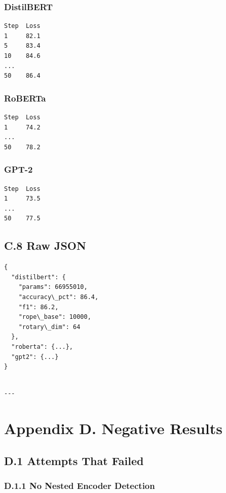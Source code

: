 \subsubsection{DistilBERT}
\begin{lstlisting}
Step  Loss
1     82.1
5     83.4
10    84.6
...
50    86.4
\end{lstlisting}

\subsubsection{RoBERTa}
\begin{lstlisting}
Step  Loss
1     74.2
...
50    78.2
\end{lstlisting}

\subsubsection{GPT-2}
\begin{lstlisting}
Step  Loss
1     73.5
...
50    77.5
\end{lstlisting}

\subsection{C.8 Raw JSON}

\begin{lstlisting}
{
  "distilbert": {
    "params": 66955010,
    "accuracy\_pct": 86.4,
    "f1": 86.2,
    "rope\_base": 10000,
    "rotary\_dim": 64
  },
  "roberta": {...},
  "gpt2": {...}
}
\end{lstlisting}
\begin{lstlisting}

---
\end{lstlisting}


\section{Appendix D. Negative Results}

\subsection{D.1 Attempts That Failed}

\subsubsection{D.1.1 No Nested Encoder Detection}

